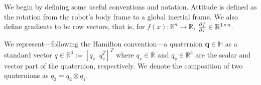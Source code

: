 \documentclass[letterpaper, 10 pt, conference]{ieeeconf}  %
\newcommand{\R}{\mathbb{R}}
\newcommand{\skewmat}[1]{[#1]^\times}
\newcommand{\q}{\textbf{q}}
\begin{document}
    We begin by defining some useful conventions and notation. 
    Attitude is defined as the rotation from the robot's body frame to a global inertial 
        frame. 
    We also define gradients to be row vectors, that is, for 
        $f(x) : \R^n \to \R$, $\pdv{f}{x} \in \R^{1\times n}$.

    We represent---following the Hamilton convention---a quaternion $\q \in \mathbb{H}$ as 
    a standard vector $q \in \R^4 := [q_s \;\; q_v^T]^T$ where $q_s \in \R$ and 
    $q_v \in \R^3$ are the scalar and vector part of the quaternion, respectively. We denote
    the composition of two quaternions as $q_3 = q_2 \otimes q_1$.
        
        
\end{document}
